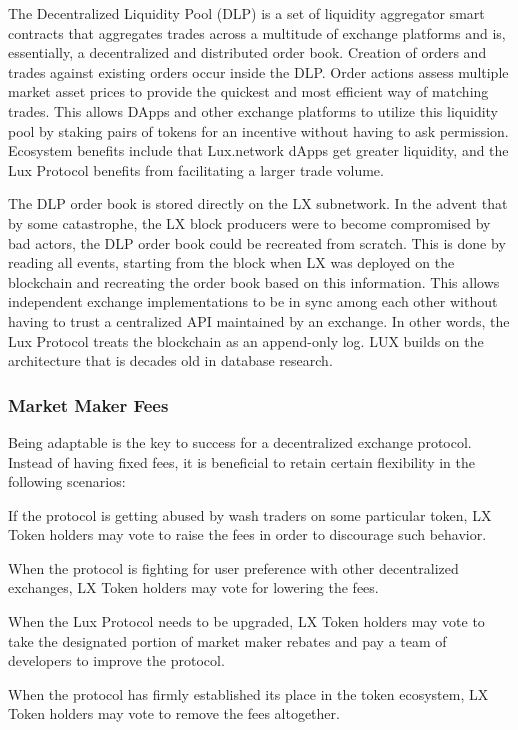 \documentclass[11pt]{article}
\begin{document}
The Decentralized Liquidity Pool (DLP) is a set of liquidity aggregator smart contracts that aggregates trades across a multitude of exchange platforms and is, essentially, a decentralized and distributed order book. Creation of orders and trades against existing orders occur inside the DLP. Order actions assess multiple market asset prices to provide the quickest and most efficient way of matching trades. This allows DApps and other exchange platforms to utilize this liquidity pool by staking pairs of tokens for an incentive without having to ask permission. Ecosystem benefits include that Lux.network dApps get greater liquidity, and the Lux Protocol benefits from facilitating a larger trade volume.


The DLP order book is stored directly on the LX subnetwork. In the advent that by some catastrophe, the LX block producers were to become compromised by bad actors, the DLP order book could be recreated from scratch. This is done by reading all events, starting from the block when LX was deployed on the blockchain and recreating the order book based on this information. This allows independent exchange implementations to be in sync among each other without having to trust a centralized API maintained by an exchange. In other words, the Lux Protocol treats the blockchain as an append-only log. LUX builds on the architecture that is decades old in database research.


\subsubsection{Market Maker Fees}

Being adaptable is the key to success for a decentralized exchange protocol. Instead of having fixed fees, it is beneficial to retain certain flexibility in the following scenarios:


If the protocol is getting abused by wash traders on some particular token, LX Token holders may vote to raise the fees in order to discourage such behavior.


When the protocol is fighting for user preference with other decentralized exchanges, LX Token holders may vote for lowering the fees.


When the Lux Protocol needs to be upgraded, LX Token holders may vote to take the designated portion of market maker rebates and pay a team of developers to improve the protocol.


When the protocol has firmly established its place in the token ecosystem, LX Token holders may vote to remove the fees altogether.
\end{document}
